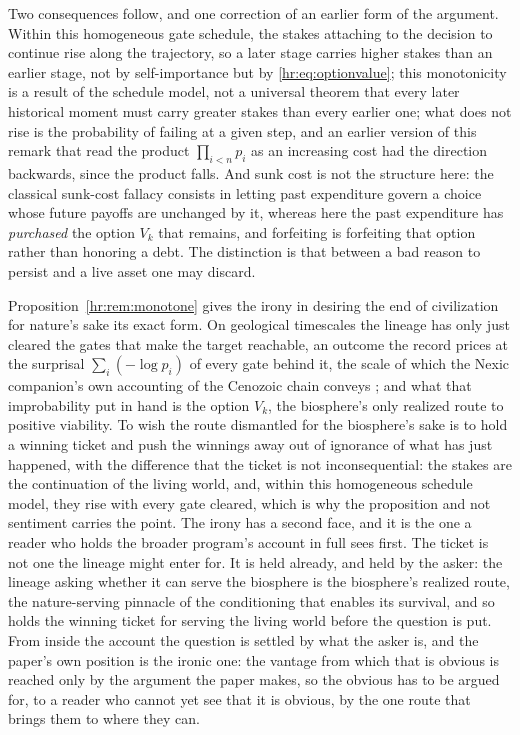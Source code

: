 \noindent Two consequences follow, and one correction of an earlier
form of the argument. Within this homogeneous gate schedule, the stakes attaching to the
decision to continue rise along the trajectory, so a later stage carries
higher stakes than an earlier stage, not by self-importance but by
\eqref{hr:eq:optionvalue}; this monotonicity is a result of the schedule
model, not a universal theorem that every later historical moment must
carry greater stakes than every earlier one;
what does not rise is the probability of failing at a given step, and an
earlier version of this remark that read the product $\prod_{i<n}p_i$
as an increasing cost had the direction backwards, since the product
falls. And sunk cost is not the structure here: the classical sunk-cost
fallacy consists in letting past expenditure govern a choice whose
future payoffs are unchanged by it, whereas here the past expenditure
has \emph{purchased} the option $V_k$ that remains, and forfeiting is
forfeiting that option rather than honoring a debt. The distinction is
that between a bad reason to persist and a live asset one may discard.

\begin{remark}\label{hr:rem:winnersirony}
Proposition~\ref{hr:rem:monotone} gives the irony in desiring the end
of civilization for nature's sake its exact form. On geological
timescales the lineage has only just cleared the gates that make the
target reachable, an outcome the record prices at the surprisal
$\sum_i(-\log p_i)$ of every gate behind it, the scale of which the
Nexic companion's own accounting of the Cenozoic chain conveys
\cite{Nexus}; and what that improbability put in hand is the option
$V_k$, the biosphere's only realized route to positive viability.
To wish the route dismantled for the biosphere's sake is to hold a
winning ticket and push the winnings away out of ignorance of what has
just happened, with the difference that the ticket is not
inconsequential: the stakes are the continuation of the living world,
and, within this homogeneous schedule model, they rise with every gate
cleared, which is why the proposition and not sentiment carries the
point.
The irony has a second face, and it is the one a reader who holds the
broader program's account in full sees first. The ticket is not one the
lineage might enter for. It is held already, and held by the asker: the
lineage asking whether it can serve the biosphere is the biosphere's
realized route, the nature-serving pinnacle of the conditioning that
enables its survival, and so holds the winning ticket for serving the
living world before the question is put. From inside the account the
question is settled by what the asker is, and the paper's own position is
the ironic one: the vantage from which that is obvious is reached only by
the argument the paper makes, so the obvious has to be argued for, to a
reader who cannot yet see that it is obvious, by the one route that brings
them to where they can.
\end{remark}

